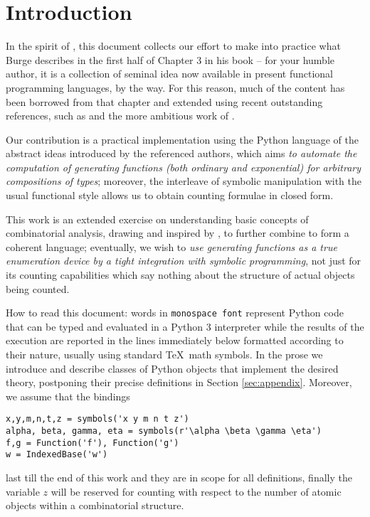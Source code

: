 
\section{Introduction}

In the spirit of \citet{burge1975recursive}, this document collects our effort
to make into practice what Burge describes in the first half of Chapter $3$ in
his book -- for your humble author, it is a collection of seminal idea now
available in present functional programming languages, by the way. For this
reason, much of the content has been borrowed from that chapter and extended
using recent outstanding references, such as \citet{sedgewick2014introduction}
and the more ambitious work of \citet{flajolet2009analytic}.

Our contribution is a practical implementation using the Python language of the
abstract ideas introduced by the referenced authors, which aims \emph{to
automate the computation of generating functions (both ordinary and
exponential) for arbitrary compositions of types}; moreover, the interleave of
symbolic manipulation with the usual functional style allows us to obtain
counting formulae in closed form.

This work is an extended exercise on understanding basic concepts of
combinatorial analysis, drawing and inspired by
\citet{riordan2002introduction}, to further combine to form a coherent
language; eventually, we wish to \textit{use generating functions as a true
enumeration device by a tight integration with symbolic programming}, not just
for its counting capabilities which say nothing about the structure of actual
objects being counted.

How to read this document: words in \texttt{monospace font} represent Python
code that can be typed and evaluated in a Python 3 interpreter while the
results of the execution are reported in the lines immediately below formatted
according to their nature, usually using standard \TeX\, math symbols. In the
prose we introduce and describe classes of Python objects that implement the
desired theory, postponing their precise definitions in Section
\ref{sec:appendix}. Moreover, we assume that the bindings
\begin{verbatim}
x,y,m,n,t,z = symbols('x y m n t z')
alpha, beta, gamma, eta = symbols(r'\alpha \beta \gamma \eta')
f,g = Function('f'), Function('g')
w = IndexedBase('w')
\end{verbatim}
last till the end of this work and they are in scope for all definitions, finally
the variable $z$ will be reserved for counting with respect to the number of
atomic objects within a combinatorial structure.

